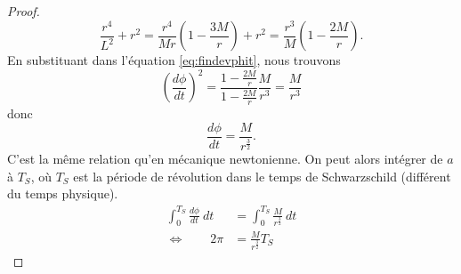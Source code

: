 \documentclass[a4paper,11pt]{report}
\begin{document}
\begin{proof}
\begin{equation}
                \frac{r^4}{L^2}+r^2 = \frac{r^4}{Mr}\left( 1-\frac{3M}{r} \right)+r^2 = \frac{r^3}{M}\left( 1-\frac{2M}{r} \right).
            \end{equation}
            En substituant dans l'équation \ref{eq:findevphit}, nous trouvons 
            \begin{equation}
                \left(\frac{d\phi}{dt}\right)^2 = \frac{1-\frac{2M}{r}}{1-\frac{2M}{r}}\frac{M}{r^3} = \frac{M}{r^3}
            \end{equation}
            donc
            \begin{equation}
                \frac{d\phi}{dt} = \frac{M}{r^{\frac{3}{2}}}.
            \end{equation}
            C'est la même relation qu'en mécanique newtonienne. On peut alors intégrer de $a$ à $T_S$, où $T_S$ est la période de révolution dans le temps de Schwarzschild (différent du temps physique).
            \begin{align}
                \int_0^{T_S}\frac{d\phi}{dt}~dt &= \int_0^{T_S}\frac{M}{r^{\frac{3}{2}}}~dt \\
                \Leftrightarrow\qquad 2\pi &= \frac{M}{r^{\frac{3}{2}}}T_S
            \end{align}
        \end{proof}
        
\end{document}
